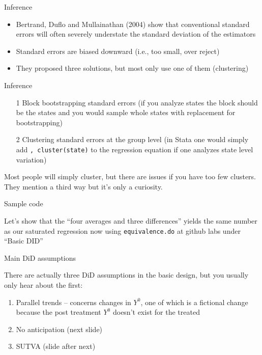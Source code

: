 \documentclass{beamer}
\begin{document}
\begin{frame}{Inference}
	
	\begin{itemize}
	\item  Bertrand, Duflo and Mullainathan (2004) show that conventional standard errors will often severely understate the standard deviation of the estimators
	\item Standard errors are biased downward (i.e., too small, over reject)
	\item They proposed three solutions, but most only use one of them (clustering)
	\end{itemize}
\end{frame}


\begin{frame}{Inference}
	
		\begin{enumerate}
		\item[1 ] Block bootstrapping standard errors (if you analyze states the block should be the states and you would sample whole states with replacement for bootstrapping)
		\item[2 ] Clustering standard errors at the group level (in Stata one would simply add \texttt{, cluster(state)} to the regression equation if one analyzes state level variation)
		\end{enumerate}

\bigskip

Most people will simply cluster, but there are issues if you have too few clusters. They mention a third way but it's only a curiosity.
		
\end{frame}

\begin{frame}{Sample code}

Let's show that the ``four averages and three differences'' yields the same number as our saturated regression now using \texttt{equivalence.do} at github labs under ``Basic DID''

\end{frame}

\begin{frame}{Main DiD assumptions}

There are actually three DiD assumptions in the basic design, but you usually only hear about the first:

\bigskip

\begin{enumerate}
\item Parallel trends -- concerns changes in $Y^0$, one of which is a fictional change because the post treatment $Y^0$ doesn't exist for the treated
\item No anticipation (next slide)
\item SUTVA (slide after next)
\end{enumerate}

\end{frame}
\end{document}
